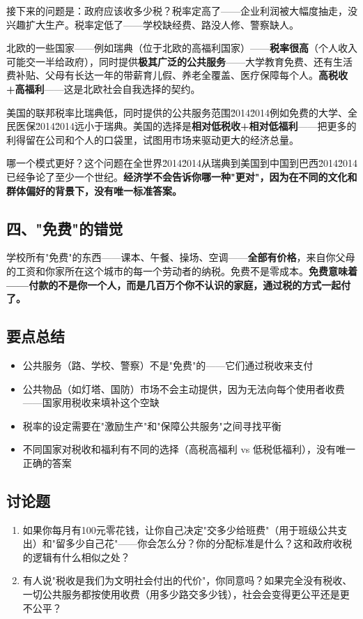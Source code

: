 \documentclass[a4paper,12pt]{ctexart}
\begin{document}
接下来的问题是：政府应该收多少税？税率定高了——企业利润被大幅度抽走，没兴趣扩大生产。税率定低了——学校缺经费、路没人修、警察缺人。

北欧的一些国家——例如瑞典（位于北欧的高福利国家）——\textbf{税率很高}（个人收入可能交一半给政府），同时提供\textbf{极其广泛的公共服务}——大学教育免费、还有生活费补贴、父母有长达一年的带薪育儿假、养老全覆盖、医疗保障每个人。\textbf{高税收+高福利}——这是北欧社会自我选择的契约。

美国的联邦税率比瑞典低，同时提供的公共服务范围\u2014\u2014例如免费的大学、全民医保\u2014\u2014远小于瑞典。美国的选择是\textbf{相对低税收+相对低福利}——把更多的利得留在公司和个人的口袋里，试图用市场来驱动更大的经济总量。

哪一个模式更好？这个问题在全世界\u2014\u2014从瑞典到美国到中国到巴西\u2014\u2014已经争论了至少一个世纪。\textbf{经济学不会告诉你哪一种"更对"，因为在不同的文化和群体偏好的背景下，没有唯一标准答案。}

\subsection*{四、"免费"的错觉}

学校所有"免费"的东西——课本、午餐、操场、空调——\textbf{全部有价格}，来自你父母的工资和你家所在这个城市的每一个劳动者的纳税。免费不是零成本。\textbf{免费意味着——付款的不是你一个人，而是几百万个你不认识的家庭，通过税的方式一起付了。}

\subsection*{要点总结}
\begin{itemize}
  \item 公共服务（路、学校、警察）不是"免费"的——它们通过税收来支付
  \item 公共物品（如灯塔、国防）市场不会主动提供，因为无法向每个使用者收费——国家用税收来填补这个空缺
  \item 税率的设定需要在"激励生产"和"保障公共服务"之间寻找平衡
  \item 不同国家对税收和福利有不同的选择（高税高福利 vs 低税低福利），没有唯一正确的答案
\end{itemize}

\subsection*{讨论题}
\begin{enumerate}
  \item 如果你每月有100元零花钱，让你自己决定"交多少给班费"（用于班级公共支出）和"留多少自己花"——你会怎么分？你的分配标准是什么？这和政府收税的逻辑有什么相似之处？
  \item 有人说"税收是我们为文明社会付出的代价"，你同意吗？如果完全没有税收、一切公共服务都按使用收费（用多少路交多少钱），社会会变得更公平还是更不公平？
\end{enumerate}
\end{document}
